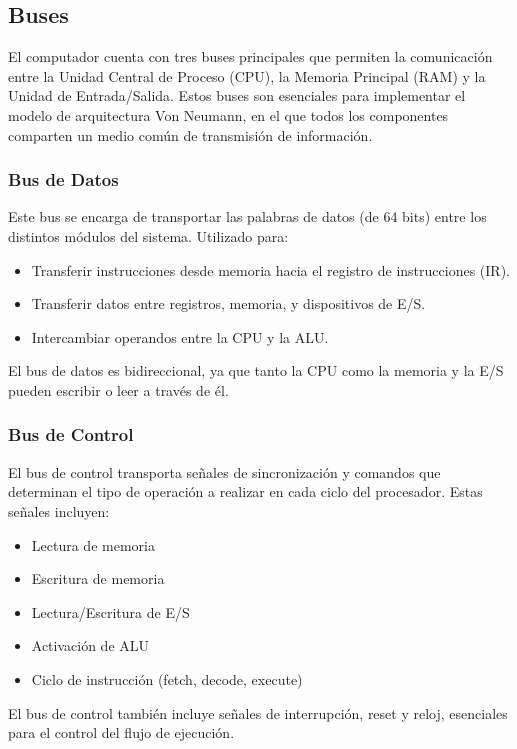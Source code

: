 \documentclass{article}
\begin{document}
\subsection{Buses}

El computador cuenta con tres buses principales que permiten la comunicación entre
la Unidad Central de Proceso (CPU), la Memoria Principal (RAM) y la Unidad de
Entrada/Salida. Estos buses son esenciales para implementar el
modelo de arquitectura Von Neumann, en el que todos los componentes
comparten un medio común de transmisión de información.

\subsubsection*{Bus de Datos}

Este bus se encarga de transportar las palabras de datos
(de 64 bits) entre los distintos módulos del sistema. Utilizado para:
\begin{itemize}
  \item Transferir instrucciones desde memoria hacia el registro de instrucciones (IR).
  \item Transferir datos entre registros, memoria, y dispositivos de E/S.
  \item Intercambiar operandos entre la CPU y la ALU.
\end{itemize}
El bus de datos es bidireccional, ya que tanto la CPU como la memoria y la E/S
pueden escribir o leer a través de él.

\subsubsection*{Bus de Control}

El bus de control transporta señales de sincronización y
comandos que determinan el tipo de operación a realizar en cada
ciclo del procesador. Estas señales incluyen:
\begin{itemize}
  \item Lectura de memoria
  \item Escritura de memoria
  \item Lectura/Escritura de E/S
  \item Activación de ALU
  \item Ciclo de instrucción (fetch, decode, execute)
\end{itemize}
El bus de control también incluye señales de interrupción, reset y
reloj, esenciales para el control del flujo de ejecución.
\end{document}
